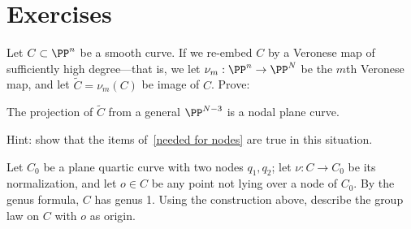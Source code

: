 \section{Exercises}

\begin{exercise}
Let $C\subset \PP^n$ be a smooth curve. If we re-embed $C$ by a Veronese map of sufficiently high degree---that is, we let $\nu_m : \PP^n \to \PP^N$ be the $m$th Veronese map, and let $\widetilde C = \nu_m(C)$ be image of $C$. Prove:

\begin{proposition}\label{positive characteristic nodes}
The projection of $\widetilde C$ from a general $\PP^{N-3}$ is a nodal plane curve.
\end{proposition}

Hint: show that the items of~\ref{needed for nodes}  are true in this situation.
\end{exercise}

\begin{exercise}
Let $C_0$ be a plane quartic curve with two nodes $q_1, q_2$; let $\nu : C \to C_0$ be its normalization, and let $o \in C$ be any point not lying over a node of $C_0$.
By the genus formula, $C$ has genus 1. Using the construction above, describe the group law on $C$ with $o$ as origin.
\end{exercise}

